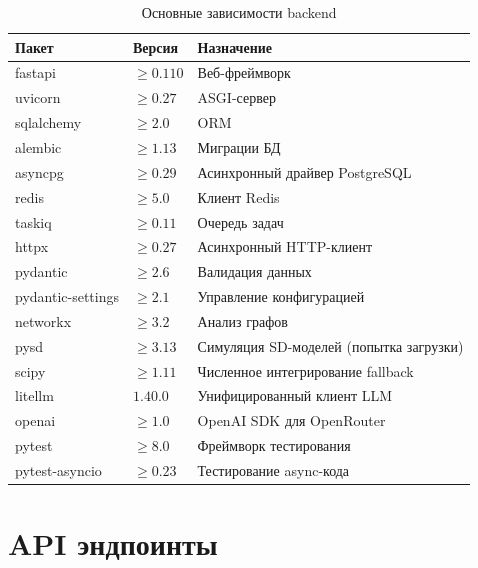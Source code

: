 \begin{table}[H]
    \centering
    \caption{Основные зависимости backend}
    \label{tab:backend-deps}
    \begin{tabular}{|l|l|l|}
        \hline
        \textbf{Пакет} & \textbf{Версия} & \textbf{Назначение} \\
        \hline
        fastapi & $\geq 0.110$ & Веб-фреймворк \\
        \hline
        uvicorn & $\geq 0.27$ & ASGI-сервер \\
        \hline
        sqlalchemy & $\geq 2.0$ & ORM \\
        \hline
        alembic & $\geq 1.13$ & Миграции БД \\
        \hline
        asyncpg & $\geq 0.29$ & Асинхронный драйвер PostgreSQL \\
        \hline
        redis & $\geq 5.0$ & Клиент Redis \\
        \hline
        taskiq & $\geq 0.11$ & Очередь задач \\
        \hline
        httpx & $\geq 0.27$ & Асинхронный HTTP-клиент \\
        \hline
        pydantic & $\geq 2.6$ & Валидация данных \\
        \hline
        pydantic-settings & $\geq 2.1$ & Управление конфигурацией \\
        \hline
        networkx & $\geq 3.2$ & Анализ графов \\
        \hline
        pysd & $\geq 3.13$ & Симуляция SD-моделей (попытка загрузки) \\
        \hline
        scipy & $\geq 1.11$ & Численное интегрирование fallback \\
        \hline
        litellm & $1.40.0$ & Унифицированный клиент LLM \\
        \hline
        openai & $\geq 1.0$ & OpenAI SDK для OpenRouter \\
        \hline
        pytest & $\geq 8.0$ & Фреймворк тестирования \\
        \hline
        pytest-asyncio & $\geq 0.23$ & Тестирование async-кода \\
        \hline
    \end{tabular}
\end{table}


\section{API эндпоинты}

